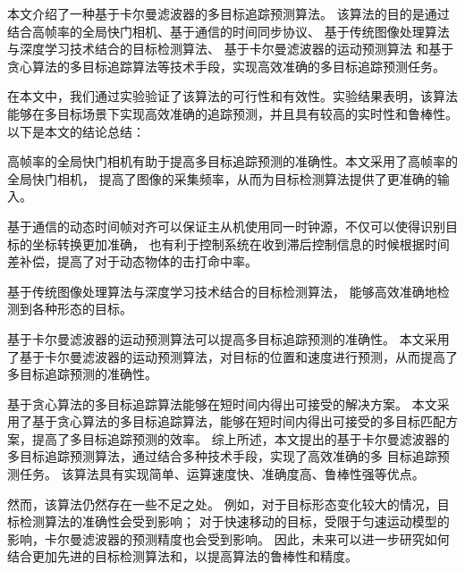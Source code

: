


\begin{conclusions}

本文介绍了一种基于卡尔曼滤波器的多目标追踪预测算法。
该算法的目的是通过结合高帧率的全局快门相机、基于通信的时间同步协议、
基于传统图像处理算法与深度学习技术结合的目标检测算法、
基于卡尔曼滤波器的运动预测算法
和基于贪心算法的多目标追踪算法等技术手段，实现高效准确的多目标追踪预测任务。

在本文中，我们通过实验验证了该算法的可行性和有效性。实验结果表明，该算法能够在多目标场景下实现高效准确的追踪预测，并且具有较高的实时性和鲁棒性。以下是本文的结论总结：

高帧率的全局快门相机有助于提高多目标追踪预测的准确性。本文采用了高帧率的全局快门相机，
提高了图像的采集频率，从而为目标检测算法提供了更准确的输入。

基于通信的动态时间帧对齐可以保证主从机使用同一时钟源，不仅可以使得识别目标的坐标转换更加准确，
也有利于控制系统在收到滞后控制信息的时候根据时间差补偿，提高了对于动态物体的击打命中率。

基于传统图像处理算法与深度学习技术结合的目标检测算法，
能够高效准确地检测到各种形态的目标。

基于卡尔曼滤波器的运动预测算法可以提高多目标追踪预测的准确性。
本文采用了基于卡尔曼滤波器的运动预测算法，对目标的位置和速度进行预测，从而提高了多目标追踪预测的准确性。

基于贪心算法的多目标追踪算法能够在短时间内得出可接受的解决方案。
本文采用了基于贪心算法的多目标追踪算法，能够在短时间内得出可接受的多目标匹配方案，提高了多目标追踪预测的效率。
综上所述，本文提出的基于卡尔曼滤波器的多目标追踪预测算法，通过结合多种技术手段，实现了高效准确的多
目标追踪预测任务。
该算法具有实现简单、运算速度快、准确度高、鲁棒性强等优点。

然而，该算法仍然存在一些不足之处。
例如，对于目标形态变化较大的情况，目标检测算法的准确性会受到影响；
对于快速移动的目标，受限于匀速运动模型的影响，卡尔曼滤波器的预测精度也会受到影响。
因此，未来可以进一步研究如何结合更加先进的目标检测算法和，以提高算法的鲁棒性和精度。



\end{conclusions}
